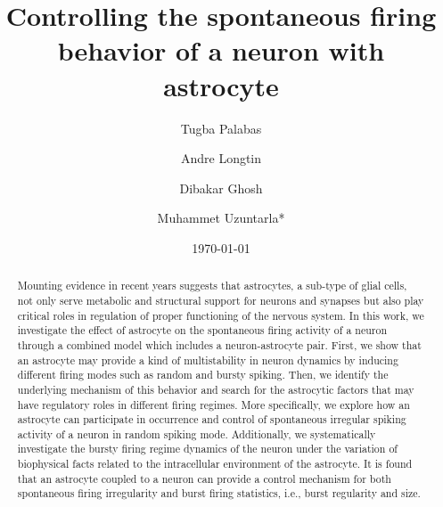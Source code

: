 \documentclass[%
 aip,
 amsmath,amssymb,
 reprint,%
]{revtex4-1}
\begin{document}

\title{Controlling the spontaneous firing behavior of a neuron with astrocyte}
\author{Tugba Palabas}

\author{Andre Longtin}
	
\author{Dibakar Ghosh}
	
\author{Muhammet Uzuntarla*}
\date{\today}%

\begin{abstract}
		
		Mounting evidence in recent years suggests that astrocytes, a sub-type of glial cells, not only serve metabolic and structural support for neurons and synapses but also play critical roles in regulation  of proper functioning of the nervous system. In this work, we investigate the effect of astrocyte on the spontaneous firing activity of a neuron through a combined model which includes a neuron-astrocyte pair. First, we show that an astrocyte may provide a kind of multistability in neuron dynamics by inducing different firing modes such as random and bursty spiking. Then, we identify the underlying mechanism of this behavior and search for the astrocytic factors that may have regulatory roles in different firing regimes. More specifically, we explore how an astrocyte can participate in occurrence and control of spontaneous irregular spiking activity of a neuron in random spiking mode. Additionally, we systematically investigate the bursty firing regime dynamics of the neuron under the variation of biophysical facts related to the intracellular environment of the astrocyte. It is found that an astrocyte coupled to a neuron can provide a control mechanism for both spontaneous firing irregularity and burst firing statistics, i.e., burst regularity and size.
		
	\end{abstract}

\maketitle
\end{document}

